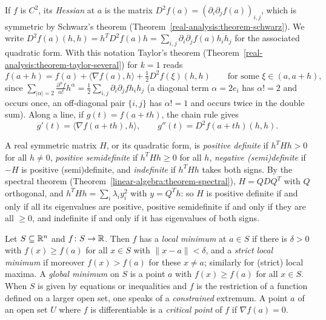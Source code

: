 If $f$ is $C^2$, its \emph{Hessian} at $a$ is the matrix $D^2f(a) = (\partial_i\partial_jf(a))_{i,j}$, which is symmetric by Schwarz's theorem (Theorem~\ref{real-analysis:theorem-schwarz}). We write
$D^2f(a)(h, h) = h^TD^2f(a)h = \sum_{i,j}\partial_i\partial_jf(a)h_ih_j$ for the associated quadratic form. With this notation Taylor's theorem (Theorem~\ref{real-analysis:theorem-taylor-several}) for $k = 1$ reads
\begin{equation}\label{real-analysis:equation-taylor-hessian}
f(a + h) = f(a) + \langle\nabla f(a), h\rangle + \tfrac12D^2f(\xi)(h, h) \qquad \text{for some } \xi \in (a, a + h),
\end{equation}
since $\sum_{|\alpha| = 2}\frac{\partial^\alpha f}{\alpha!}h^\alpha = \frac12\sum_{i,j}\partial_i\partial_jfh_ih_j$ (a diagonal term $\alpha = 2e_i$ has $\alpha! = 2$ and occurs once, an off-diagonal pair $\{i, j\}$ has
$\alpha! = 1$ and occurs twice in the double sum). Along a line, if $g(t) = f(a + th)$, the chain rule gives
\begin{equation}\label{real-analysis:equation-line-derivatives}
g'(t) = \langle\nabla f(a + th), h\rangle, \qquad g''(t) = D^2f(a + th)(h, h).
\end{equation}

A real symmetric matrix $H$, or its quadratic form, is \emph{positive definite} if $h^THh > 0$ for all $h \neq 0$, \emph{positive semidefinite} if $h^THh \geq 0$ for all $h$, \emph{negative (semi)definite} if
$-H$ is positive (semi)definite, and \emph{indefinite} if $h^THh$ takes both signs. By the spectral theorem (Theorem~\ref{linear-algebra:theorem-spectral}), $H = QDQ^T$ with $Q$ orthogonal, and
$h^THh = \sum_i\lambda_iy_i^2$ with $y = Q^Th$: so $H$ is positive definite if and only if all its eigenvalues are positive, positive semidefinite if and only if they are all $\geq 0$, and indefinite if
and only if it has eigenvalues of both signs.

\begin{definition}\label{real-analysis:definition-local-extremum-several}
Let $S \subseteq \mathbb{R}^n$ and $f \colon S \to \mathbb{R}$. Then $f$ has a \emph{local minimum} at $a \in S$ if there is $\delta > 0$ with $f(x) \geq f(a)$ for all $x \in S$ with $\|x - a\| < \delta$, and a \emph{strict local
minimum} if moreover $f(x) > f(a)$ for these $x \neq a$; similarly for (strict) local maxima. A \emph{global minimum} on $S$ is a point $a$ with $f(x) \geq f(a)$ for all $x \in S$. When $S$ is given by
equations or inequalities and $f$ is the restriction of a function defined on a larger open set, one speaks of a \emph{constrained} extremum. A point $a$ of an open set $U$ where $f$ is differentiable
is a \emph{critical point} of $f$ if $\nabla f(a) = 0$.
\end{definition}

